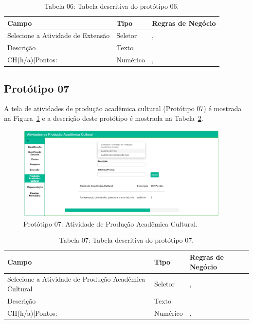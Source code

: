 \begin{table}[H]
\centering
\caption[Tabela 06: Tabela descritiva do protótipo 06.]{Tabela 06: Tabela descritiva do protótipo 06.}
\label{tab:prot06}
\begin{tabular}{@{}lll@{}}
\toprule
Campo                             & Tipo     &  Regras de Negócio     \\ \midrule
Selecione a Atividade de Extensão & Seletor  &    \nameref{rn009}, \nameref{rn019}\\
Descrição                         & Texto    &    \nameref{rn009}                 \\
CH(h/a)|Pontos:                   & Numérico &    \nameref{rn009}, \nameref{rn020}\\ \bottomrule
\end{tabular}
\end{table}

\newpage
\subsection{Protótipo 07}\label{prototipo07}
A tela de atividades de produção acadêmica cultural (Protótipo 07) é mostrada na Figura~\ref{fig:prot07} e a descrição deste protótipo é mostrada na Tabela~\ref{tab:prot07}.


\begin{figure}[H]
    \centering
    \includegraphics[width=0.95\textwidth]{img/7pagina_de_prod_academica.png}
    \caption[Protótipo 07: Atividade de Produção Acadêmica Cultural]{Protótipo 07: Atividade de Produção Acadêmica Cultural.}
    \label{fig:prot07}
\end{figure}


\begin{table}[H]
\centering
\caption[Tabela 07: Tabela descritiva do protótipo 07.]{Tabela 07: Tabela descritiva do protótipo 07.}
\label{tab:prot07}
\begin{tabular}{@{}lll@{}}
\toprule
Campo                                                & Tipo     &  Regras de Negócio     \\ \midrule
Selecione a Atividade de Produção Acadêmica Cultural & Seletor  &    \nameref{rn010}, \nameref{rn019}\\
Descrição                                            & Texto    &    \nameref{rn010}                 \\
CH(h/a)|Pontos:                                      & Numérico &    \nameref{rn010}, \nameref{rn020}\\ \bottomrule
\end{tabular}
\end{table}

